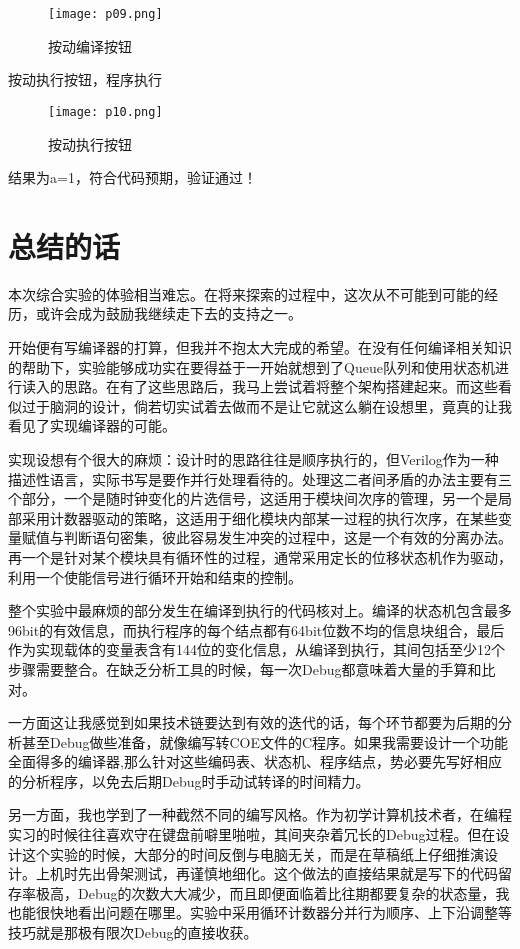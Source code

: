 \documentclass[lang=cn,11pt,a4paper]{elegantpaper}
\begin{document}
\begin{figure}[H]
	\centering
	\texttt{[image: p09.png]}
	\caption{按动编译按钮}
\end{figure}

按动执行按钮，程序执行

\begin{figure}[H]
	\centering
	\texttt{[image: p10.png]}
	\caption{按动执行按钮}
\end{figure}

结果为a=1，符合代码预期，验证通过！

\section{总结的话}
本次综合实验的体验相当难忘。在将来探索的过程中，这次从不可能到可能的经历，或许会成为鼓励我继续走下去的支持之一。

开始便有写编译器的打算，但我并不抱太大完成的希望。在没有任何编译相关知识的帮助下，实验能够成功实在要得益于一开始就想到了Queue队列和使用状态机进行读入的思路。在有了这些思路后，我马上尝试着将整个架构搭建起来。而这些看似过于脑洞的设计，倘若切实试着去做而不是让它就这么躺在设想里，竟真的让我看见了实现编译器的可能。
 
实现设想有个很大的麻烦：设计时的思路往往是顺序执行的，但Verilog作为一种描述性语言，实际书写是要作并行处理看待的。处理这二者间矛盾的办法主要有三个部分，一个是随时钟变化的片选信号，这适用于模块间次序的管理，另一个是局部采用计数器驱动的策略，这适用于细化模块内部某一过程的执行次序，在某些变量赋值与判断语句密集，彼此容易发生冲突的过程中，这是一个有效的分离办法。再一个是针对某个模块具有循环性的过程，通常采用定长的位移状态机作为驱动，利用一个使能信号进行循环开始和结束的控制。

整个实验中最麻烦的部分发生在编译到执行的代码核对上。编译的状态机包含最多96bit的有效信息，而执行程序的每个结点都有64bit位数不均的信息块组合，最后作为实现载体的变量表含有144位的变化信息，从编译到执行，其间包括至少12个步骤需要整合。在缺乏分析工具的时候，每一次Debug都意味着大量的手算和比对。

一方面这让我感觉到如果技术链要达到有效的迭代的话，每个环节都要为后期的分析甚至Debug做些准备，就像编写转COE文件的C程序。如果我需要设计一个功能全面得多的编译器,那么针对这些编码表、状态机、程序结点，势必要先写好相应的分析程序，以免去后期Debug时手动试转译的时间精力。

另一方面，我也学到了一种截然不同的编写风格。作为初学计算机技术者，在编程实习的时候往往喜欢守在键盘前噼里啪啦，其间夹杂着冗长的Debug过程。但在设计这个实验的时候，大部分的时间反倒与电脑无关，而是在草稿纸上仔细推演设计。上机时先出骨架测试，再谨慎地细化。这个做法的直接结果就是写下的代码留存率极高，Debug的次数大大减少，而且即便面临着比往期都要复杂的状态量，我也能很快地看出问题在哪里。实验中采用循环计数器分并行为顺序、上下沿调整等技巧就是那极有限次Debug的直接收获。


%
\end{document}
